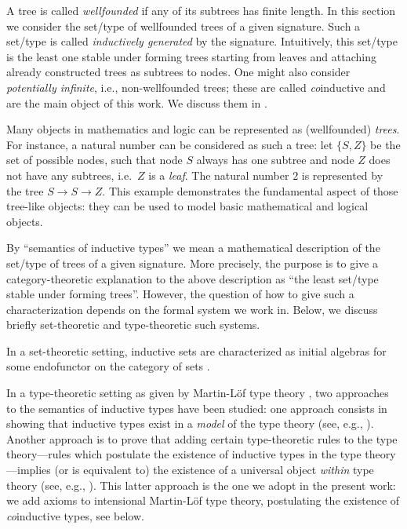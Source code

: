 \documentclass[a4paper,USenglish]{lipics}
\newcommand{\parencite}[1]{\cite{#1}}
\begin{document}
 A tree is called \emph{wellfounded} if any of its subtrees has finite length. In this section we consider the set/type of wellfounded trees of 
 a given signature. Such a set/type is called \emph{inductively generated} by the signature. Intuitively, this set/type is the least one stable under
 forming trees starting from leaves and attaching already constructed trees as subtrees to nodes.
 One might also consider \emph{potentially infinite}, i.e., non-wellfounded trees; these are called \emph{co}inductive and are the main object of this work.
 We discuss them in .
 
 
 Many objects in mathematics and logic can be represented as (wellfounded) \emph{trees}.
 For instance, a natural number can be considered as such a tree: let $\{S,Z\}$ be the set of possible nodes, 
 such that node $S$ always has one subtree and node $Z$ does not have any subtrees, i.e.\ $Z$ is a \emph{leaf}.
 The natural number $2$ is represented by the tree $S\longrightarrow S\longrightarrow Z$. 
 This example demonstrates the fundamental aspect of those tree-like objects: they can be used to model basic mathematical and logical objects.
 
  
 By \enquote{semantics of inductive types} we mean a mathematical description of the set/type of trees of a given signature. 
 More precisely, the purpose is to give a category-theoretic explanation to the above description as \enquote{the least set/type stable under forming trees}.
 However, the question of how to give such a characterization depends on the formal system we work in. 
 Below, we discuss briefly set-theoretic and type-theoretic such systems.
 
 In a set-theoretic setting, inductive sets are characterized as initial algebras for 
 some endofunctor on the category of sets \parencite{jacobs1997tutorial}.
 
 In a type-theoretic setting as given by Martin-L\"of type theory \parencite{martin_lof}, 
 two approaches to the semantics of inductive types have been studied: 
 one approach consists in showing that inductive types exist in a \emph{model} of the type theory
 (see, e.g., \cite{DBLP:journals/apal/MoerdijkP00}).
 Another approach is to prove that adding certain type-theoretic rules to the type theory---rules which postulate the existence
 of inductive types in the type theory---implies (or is equivalent to) the existence of a universal object \emph{within} type theory
 (see, e.g., \parencite{DBLP:conf/lics/AwodeyGS12, DBLP:journals/tcs/Dybjer97}).
 This latter approach is the one we adopt in the present work: we add axioms to intensional Martin-Löf type theory,
 postulating the existence of \emph{co}inductive types, see below.
 
\end{document}
